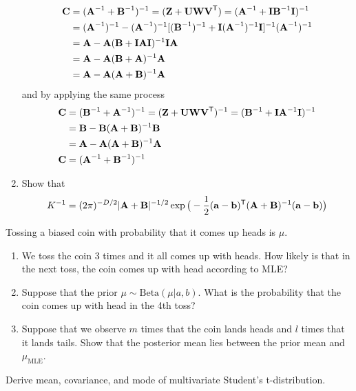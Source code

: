 \documentclass{amsmlaj}
\begin{document}
\begin{problem}
\begin{enumerate}
	\begin{equation}
		\begin{split}
			\bm{\mathbf{C}}&=(\bm{\mathbf{A}}^{-1}+\bm{\mathbf{B}}^{-1})^{-1}
			=(\bm{\mathbf{Z}}+\bm{\mathbf{U}}\bm{\mathbf{W}}\bm{\mathbf{V}}^{\mathsf{T}})
			=(\bm{\mathbf{A}}^{-1}+\bm{\mathbf{I}}\bm{\mathbf{B}}^{-1}\bm{\mathbf{I}})^{-1} \\
			&=(\bm{\mathbf{A}}^{-1})^{-1}-(\bm{\mathbf{A}}^{-1})^{-1}[(\bm{\mathbf{B}}^{-1})^{-1}
			+\bm{\mathbf{I}}(\bm{\mathbf{A}}^{-1})^{-1}\bm{\mathbf{I}}]^{-1}(\bm{\mathbf{A}}^{-1})^{-1} \\
			&=\bm{\mathbf{A}}-\bm{\mathbf{A}}(\bm{\mathbf{B}}+\bm{\mathbf{I}}\bm{\mathbf{A}}\bm{\mathbf{I}})^{-1}\bm{\mathbf{I}}\bm{\mathbf{A}} \\
			&=\bm{\mathbf{A}}-\bm{\mathbf{A}}(\bm{\mathbf{B}}+\bm{\mathbf{A}})^{-1}\bm{\mathbf{A}} \\
			&=\bm{\mathbf{A}}-\bm{\mathbf{A}}(\bm{\mathbf{A}}+\bm{\mathbf{B}})^{-1}\bm{\mathbf{A}}
		\end{split}
	\end{equation}
	and by applying the same process
	\begin{equation}
		\begin{split}
			\bm{\mathbf{C}}&=(\bm{\mathbf{B}}^{-1}+\bm{\mathbf{A}}^{-1})^{-1}
			=(\bm{\mathbf{Z}}+\bm{\mathbf{U}}\bm{\mathbf{W}}\bm{\mathbf{V}}^{\mathsf{T}})^{-1}
			=(\bm{\mathbf{B}}^{-1}+\bm{\mathbf{I}}\bm{\mathbf{A}}^{-1}\bm{\mathbf{I}})^{-1} \\
			&=\bm{\mathbf{B}}-\bm{\mathbf{B}}(\bm{\mathbf{A}}+\bm{\mathbf{B}})^{-1}\bm{\mathbf{B}} \\
			&=\bm{\mathbf{A}}-\bm{\mathbf{A}}(\bm{\mathbf{A}}+\bm{\mathbf{B}})^{-1}\bm{\mathbf{A}} \\
			\bm{\mathbf{C}}&=(\bm{\mathbf{A}}^{-1}+\bm{\mathbf{B}}^{-1})^{-1}
		\end{split}
	\end{equation}

\item Show that
				\begin{equation}
								K^{-1} = (2\pi)^{-D/2}|\bm{\mathbf{A}}+\bm{\mathbf{B}}|^{-1/2}
								\exp\big( -\frac{1}{2}(\bm{\mathbf{a}}-\bm{\mathbf{b}})^{\mathsf{T}}
								(\bm{\mathbf{A}}+\bm{\mathbf{B}})^{-1} (\bm{\mathbf{a}}-\bm{\mathbf{b}})\big)
				\end{equation}
\end{enumerate}
\end{problem}


\begin{problem}
Tossing a biased coin with probability that it comes up heads is $\mu$. 
\begin{enumerate}
\item We toss the coin 3 times and it all comes up with heads.
				How likely is that in the next toss, the coin comes up
				with head according to MLE?
\item Suppose that the prior $\mu \sim \text{Beta}(\mu|a,b)$.
				What is the probability  that the coin comes up with
				head in the 4th toss?
\item Suppose that we observe $m$ times that the coin lands
				heads and $l$ times that it lands tails. Show that the
				posterior mean lies between the prior mean and
				$\mu_{\text{MLE}}$.
\end{enumerate}
\end{problem}

\begin{extraproblem}
Derive mean, covariance, and mode of multivariate Student's
t-distribution.
\end{extraproblem}
\end{document}
